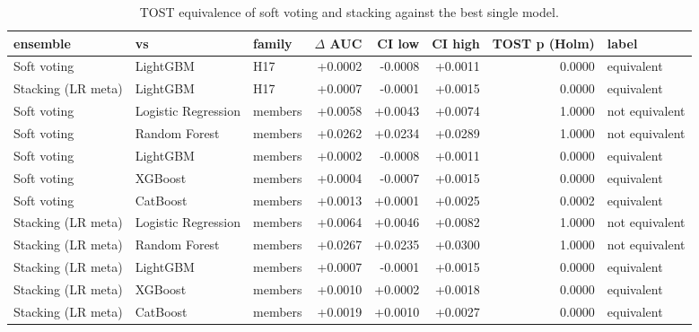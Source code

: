 \begin{table}[t]
\centering
\caption{TOST equivalence of soft voting and stacking against the best single model.}
\label{tab:T12b_ensemble_tests}
\small
\begin{tabular}{lllrrrrl}
\toprule
ensemble & vs & family & $\Delta$ AUC & CI low & CI high & TOST p (Holm) & label \\
\midrule
Soft voting & LightGBM & H17 & +0.0002 & -0.0008 & +0.0011 & 0.0000 & equivalent \\
Stacking (LR meta) & LightGBM & H17 & +0.0007 & -0.0001 & +0.0015 & 0.0000 & equivalent \\
Soft voting & Logistic Regression & members & +0.0058 & +0.0043 & +0.0074 & 1.0000 & not equivalent \\
Soft voting & Random Forest & members & +0.0262 & +0.0234 & +0.0289 & 1.0000 & not equivalent \\
Soft voting & LightGBM & members & +0.0002 & -0.0008 & +0.0011 & 0.0000 & equivalent \\
Soft voting & XGBoost & members & +0.0004 & -0.0007 & +0.0015 & 0.0000 & equivalent \\
Soft voting & CatBoost & members & +0.0013 & +0.0001 & +0.0025 & 0.0002 & equivalent \\
Stacking (LR meta) & Logistic Regression & members & +0.0064 & +0.0046 & +0.0082 & 1.0000 & not equivalent \\
Stacking (LR meta) & Random Forest & members & +0.0267 & +0.0235 & +0.0300 & 1.0000 & not equivalent \\
Stacking (LR meta) & LightGBM & members & +0.0007 & -0.0001 & +0.0015 & 0.0000 & equivalent \\
Stacking (LR meta) & XGBoost & members & +0.0010 & +0.0002 & +0.0018 & 0.0000 & equivalent \\
Stacking (LR meta) & CatBoost & members & +0.0019 & +0.0010 & +0.0027 & 0.0000 & equivalent \\
\bottomrule
\end{tabular}
\end{table}
